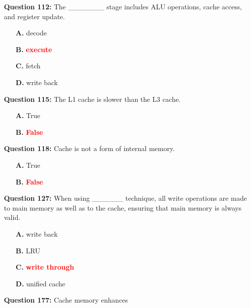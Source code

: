 \documentclass[12pt,a4paper]{article}
\begin{document}
\vspace{0.5cm}

\textbf{Question 112:} The _______ stage includes ALU operations, cache access, and register update.

\begin{itemize}
    \item[\textbf{A.}] decode
    \item[\textbf{B.}] \textcolor{red}{\textbf{execute}}
    \item[\textbf{C.}] fetch
    \item[\textbf{D.}] write back
\end{itemize}

\vspace{0.5cm}

\textbf{Question 115:} The L1 cache is slower than the L3 cache.

\begin{itemize}
    \item[\textbf{A.}] True
    \item[\textbf{B.}] \textcolor{red}{\textbf{False}}
\end{itemize}

\vspace{0.5cm}

\textbf{Question 118:} Cache is not a form of internal memory.

\begin{itemize}
    \item[\textbf{A.}] True
    \item[\textbf{B.}] \textcolor{red}{\textbf{False}}
\end{itemize}

\vspace{0.5cm}

\textbf{Question 127:} When using ______ technique, all write operations are made to main memory as well as to the cache, ensuring that main memory is always valid.

\begin{itemize}
    \item[\textbf{A.}] write back
    \item[\textbf{B.}] LRU
    \item[\textbf{C.}] \textcolor{red}{\textbf{write through}}
    \item[\textbf{D.}] unified cache
\end{itemize}

\vspace{0.5cm}

\textbf{Question 177:} Cache memory enhances
\end{document}
